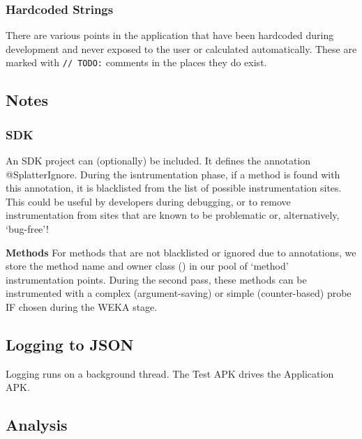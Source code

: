 \subsubsection{Hardcoded Strings}

There are various points in the application that have been hardcoded during development and never exposed to the user or calculated automatically. These are marked with \texttt{// TODO:} comments in the places they do exist.

\subsection{Notes}

\subsubsection{SDK}

An SDK project can (optionally) be included. It defines the annotation @SplatterIgnore. During the isntrumentation phase, if a method is found with this annotation, it is blacklisted from the list of possible instrumentation sites. This could be useful by developers during debugging, or to remove instrumentation from sites that are known to be problematic or, alternatively, {\lq}bug-free{\rq}!

\textbf{Methods}
For methods that are not blacklisted or ignored due to annotations, we store the method name and owner class () in our pool of {\lq}method{\rq} instrumentation points. During the second pass, these methods can be instrumented with a complex (argument-saving) or simple (counter-based) probe IF chosen during the WEKA stage.

\subsection{Logging to JSON}


Logging runs on a background thread. The Test APK drives the Application APK.

\subsection{Analysis}


